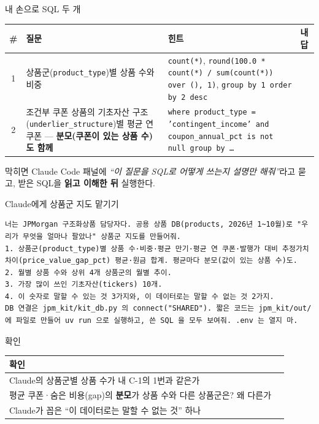 \begin{frame}{ 내 손으로 SQL 두 개 }
\footnotesize
\begin{tabularx}{\textwidth}{@{}c >{\raggedright\arraybackslash}p{4.2cm} >{\raggedright\arraybackslash}X p{2.6cm}@{}}
\toprule
\textbf{\#} & \textbf{질문} & \textbf{힌트} & \textbf{내 답} \\
\midrule
1 & 상품군(\texttt{product\_type})별 상품 수와 비중 & \texttt{count(*)}, \texttt{round(100.0 * count(*) / sum(count(*)) over (), 1)}, \texttt{group by 1 order by 2 desc} & \\[4pt]
2 & 조건부 쿠폰 상품의 기초자산 구조(\texttt{underlier\_structure})별 평균 연 쿠폰 — \textbf{분모(쿠폰이 있는 상품 수)도 함께} & \texttt{where product\_type = 'contingent\_income' and coupon\_annual\_pct is not null group by …} & \\[4pt]
\bottomrule
\end{tabularx}
\vspace{0.8em}
\begin{block}{막히면}
\small Claude Code 패널에 \textit{``이 질문을 SQL로 어떻게 쓰는지 설명만 해줘''}라고 묻고, 받은 SQL을 \textbf{읽고 이해한 뒤} 실행한다.
\end{block}
\end{frame}

\begin{frame}[fragile]{ Claude에게 상품군 지도 맡기기 }
\begin{Verbatim}[fontsize=\footnotesize]
너는 JPMorgan 구조화상품 담당자다. 공용 상품 DB(products, 2026년 1~10월)로 "우리가 무엇을 얼마나 팔았나" 상품군 지도를 만들어줘.
1. 상품군(product_type)별 상품 수·비중·평균 만기·평균 연 쿠폰·발행가 대비 추정가치 차이(price_value_gap_pct) 평균·원금 합계. 평균마다 분모(값이 있는 상품 수)도.
2. 월별 상품 수와 상위 4개 상품군의 월별 추이.
3. 가장 많이 쓰인 기초자산(tickers) 10개.
4. 이 숫자로 말할 수 있는 것 3가지와, 이 데이터로는 말할 수 없는 것 2가지.
DB 연결은 jpm_kit/kit_db.py 의 connect("SHARED"). 짧은 코드는 jpm_kit/out/ 에 파일로 만들어 uv run 으로 실행하고, 쓴 SQL 을 모두 보여줘. .env 는 열지 마.
\end{Verbatim}
\end{frame}

\begin{frame}{ 확인}
\begin{tabularx}{\textwidth}{@{}X p{5.6cm}@{}}
\toprule
\textbf{확인} & \\
\midrule
Claude의 상품군별 상품 수가 내 C-1의 1번과 같은가 & \\[8pt]
평균 쿠폰·숨은 비용(gap)의 \textbf{분모}가 상품 수와 다른 상품군은? 왜 다른가 & \\[8pt]
Claude가 꼽은 ``이 데이터로는 말할 수 없는 것'' 하나 & \\[8pt]
\bottomrule
\end{tabularx}
\end{frame}

